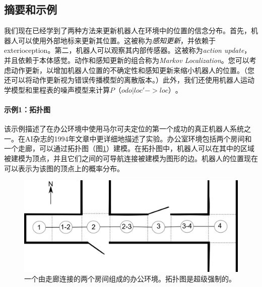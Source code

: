 \subsection{摘要和示例}
我们现在已经学到了两种方法来更新机器人在环境中的位置的信念分布。首先，机器人可以使用外部地标来更新其位置。这被称为\emph{感知更新}，并依赖于exterioception。第二，机器人可以观察其内部传感器。这被称为\emph{action update}，并且依赖于本体感觉。动作和感知更新的组合称为\emph{Markov Localization}。您可以考虑动作更新，以增加机器人位置的不确定性和感知更新来缩小机器人的位置。（您还可以将动作更新视为错误传播模型的离散版本。）此外，我们还使用机器人运动学模型和里程表的噪声模型来计算$P（odo|loc'->loc）$。


\paragraph{示例1：拓扑图}
该示例描述了在办公环境中使用马尔可夫定位的第一个成功的真正机器人系统之一。在AI杂志的1994年文章中更详细地描述了实验。办公室环境包括两个房间和一个走廊，可以通过拓扑图（图\ref{fig:dervish_example}）建模。在拓扑图中，机器人可以在其中的区域被建模为顶点，并且它们之间的可导航连接被建模为图形的边。机器人的位置现在可以表示为该图的顶点上的概率分布。

\begin{figure}
	\centering
		\includegraphics[width=\textwidth]{figs/dervish_example}
	\caption{一个由走廊连接的两个房间组成的办公环境。拓扑图是超级强制的。}
	\label{fig:dervish_example}
\end{figure}

